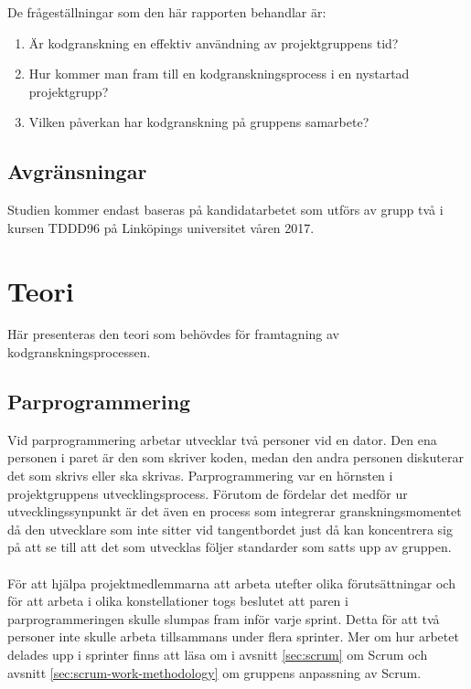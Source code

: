 De frågeställningar som den här rapporten behandlar är:
\begin{enumerate}
\item Är kodgranskning en effektiv användning av projektgruppens tid?
\item Hur kommer man fram till en kodgranskningsprocess i en nystartad projektgrupp?
\item Vilken påverkan har kodgranskning på gruppens samarbete?
\end{enumerate}

\subsection{Avgränsningar}
\label{sec:victor-delimitations}

Studien kommer endast baseras på kandidatarbetet som utförs av
grupp två i kursen TDDD96 på Linköpings universitet våren 2017. 

\section{Teori}
\label{sec:victor-theory}
Här presenteras den teori som behövdes för framtagning av kodgranskningsprocessen.
\subsection{Parprogrammering}
Vid parprogrammering arbetar utvecklar två personer vid en dator. Den ena personen i paret är den som skriver koden, medan den andra personen diskuterar det som skrivs eller ska skrivas.\cite{website:smartbear} Parprogrammering var en hörnsten i projektgruppens utvecklingsprocess. Förutom de fördelar det medför ur utvecklingssynpunkt är det även en process som integrerar granskningsmomentet då den utvecklare som inte sitter vid tangentbordet just då kan koncentrera sig på att se till att det som utvecklas följer standarder som satts upp av gruppen. 
\\ \\
För att hjälpa projektmedlemmarna att arbeta utefter olika förutsättningar och för att arbeta i olika konstellationer togs beslutet att paren i parprogrammeringen skulle slumpas fram inför varje sprint. Detta för att två personer inte skulle arbeta tillsammans under flera sprinter. Mer om hur arbetet delades upp i sprinter finns att läsa om i avsnitt \ref{sec:scrum} om Scrum och avsnitt \ref{sec:scrum-work-methodology} om gruppens anpassning av Scrum.
